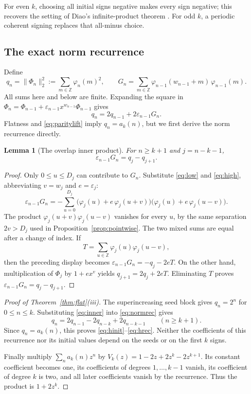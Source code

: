 \documentclass[11pt,letterpaper]{article}
\numberwithin{equation}{section}
\newtheorem{lemma}[theorem]{Lemma}
\theoremstyle{definition}
\theoremstyle{remark}
\newcommand{\Z}{\mathbb Z}
\newcommand{\eps}{\varepsilon}
\newcommand{\normsq}[1]{\lVert #1\rVert_2^2}
\begin{document}
For even $k$, choosing all initial signs negative makes every sign negative;
this recovers the setting of Diao's infinite-product theorem \cite{Diao}.
For odd $k$, a periodic coherent signing replaces that all-minus choice.

\subsection{The exact norm recurrence}
\label{sec:norm}

Define
\[
 q_n=\normsq{\Phi_n}:=\sum_{m\in\Z}\varphi_n(m)^2,
 \qquad
 G_n=\sum_{m\in\Z}\varphi_{n-1}(w_{n-1}+m)\,\varphi_{n-1}(m).
\]
All sums here and below are finite. Expanding the square in
$\Phi_n=\Phi_{n-1}+\eps_{n-1}x^{w_{n-1}}\Phi_{n-1}$ gives
\begin{equation}
 q_n=2q_{n-1}+2\eps_{n-1}G_n.
 \label{eq:normrec}
\end{equation}
Flatness and \eqref{eq:paritylift} imply $q_n=a_k(n)$, but we first derive
the norm recurrence directly.

\begin{lemma}[The overlap inner product]
\label{lem:inner}
For $n\ge k+1$ and $j=n-k-1$,
\begin{equation}
 \eps_{n-1}G_n=q_j-q_{j+1}.
 \label{eq:inner}
\end{equation}
\end{lemma}
\begin{proof}
Only $0\le u\le D_j$ can contribute to $G_n$. Substitute \eqref{eq:low} and
\eqref{eq:high}, abbreviating $v=w_j$ and $e=\eps_j$:
\[
 \eps_{n-1}G_n=-\sum_{u=0}^{D_j}
 \bigl(\varphi_j(u)+e\,\varphi_j(u+v)\bigr)
 \bigl(\varphi_j(u)+e\,\varphi_j(u-v)\bigr).
\]
The product $\varphi_j(u+v)\varphi_j(u-v)$ vanishes for every $u$, by the
same separation $2v>D_j$ used in Proposition~\ref{prop:pointwise}. The two
mixed sums are equal after a change of index. If
\[
 T=\sum_{u\in\Z}\varphi_j(u)\varphi_j(u-v),
\]
then the preceding display becomes $\eps_{n-1}G_n=-q_j-2eT$.
On the other hand, multiplication of $\Phi_j$ by $1+ex^v$ yields
$q_{j+1}=2q_j+2eT$. Eliminating $T$ proves $\eps_{n-1}G_n=q_j-q_{j+1}$.
\end{proof}

\begin{proof}[Proof of Theorem~\ref{thm:flat}(iii)]
The superincreasing seed block gives $q_n=2^n$ for $0\le n\le k$.
Substituting \eqref{eq:inner} into \eqref{eq:normrec} gives
\[
 q_n=2q_{n-1}-2q_{n-k}+2q_{n-k-1}\qquad(n\ge k+1).
\]
Since $q_n=a_k(n)$, this proves \eqref{eq:hinit}--\eqref{eq:hrec}.
Neither the coefficients of this recurrence nor its initial values depend
on the seeds or on the first $k$ signs.

Finally multiply $\sum_n a_k(n)z^n$ by $V_k(z)=1-2z+2z^k-2z^{k+1}$. Its
constant coefficient becomes one, its coefficients of degrees
$1,\ldots,k-1$ vanish, its coefficient of degree $k$ is two, and all later
coefficients vanish by the recurrence. Thus the product is $1+2z^k$.
\end{proof}
\end{document}
